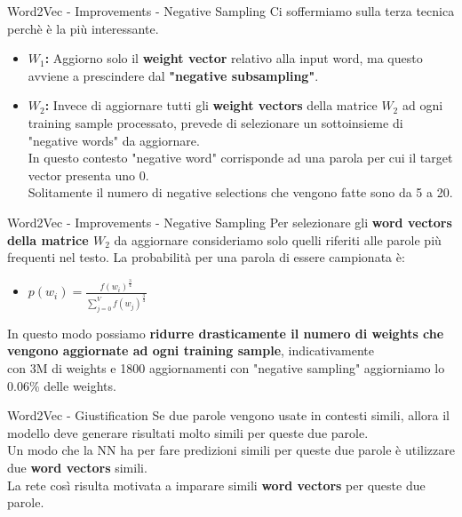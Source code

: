 \documentclass[british]{beamer}
\begin{document}
\begin{frame}{Word2Vec - Improvements - Negative Sampling}
	Ci soffermiamo sulla terza tecnica perch\`{e} \`{e} la pi\`{u} interessante.\\
	\begin{itemize}
		\item \textbf{\(W_1\): }Aggiorno solo il \textbf{weight vector} relativo alla input word, ma questo avviene a prescindere dal \textbf{"negative subsampling"}.
		\item \textbf{\(W_2\): }Invece di aggiornare tutti gli \textbf{weight vectors} della matrice \(W_2\) ad ogni training sample processato, prevede di selezionare un sottoinsieme di "negative words" da aggiornare.\\
		In questo contesto "negative word" corrisponde ad una parola per cui il target vector presenta uno 0.\\
		Solitamente il numero di negative selections che vengono fatte sono da 5 a 20.
	\end{itemize}
\end{frame}

\begin{frame}{Word2Vec - Improvements - Negative Sampling}
	Per selezionare gli \textbf{word vectors della matrice \(W_2\)} da aggiornare consideriamo solo quelli riferiti alle parole pi\`{u} frequenti nel testo.
	La probabilit\`{a} per una parola di essere campionata \`{e}:
	\begin{itemize}
		\item \(p(w_i) = \frac{f(w_i)^\frac{3}{4}}{\sum_{j=0}^{V} f(w_j)^\frac{3}{4}}\)
	\end{itemize}
	In questo modo possiamo \textbf{ridurre drasticamente il numero di weights che vengono aggiornate ad ogni training sample}, indicativamente \\con 3M di weights e 1800 aggiornamenti con "negative sampling" aggiorniamo lo 0.06\% delle weights.
\end{frame}

\begin{frame}{Word2Vec - Giustification}
	Se due parole vengono usate in contesti simili, allora il modello deve generare risultati molto simili per queste due parole.\\
	Un modo che la NN ha per fare predizioni simili per queste due parole \`{e} utilizzare due \textbf{word vectors} simili.\\
	La rete cos\`{i} risulta motivata a imparare simili \textbf{word vectors} per queste due parole.
\end{frame}
\end{document}
